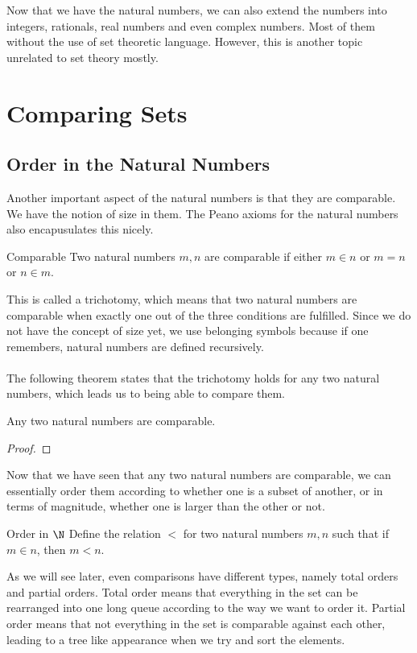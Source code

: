 Now that we have the natural numbers, we can also extend the numbers into integers, rationals, real numbers and even complex numbers. Most of them without the use of set theoretic language. However, this is another topic unrelated to set theory mostly. 

\pagebreak
\section{Comparing Sets}
\subsection{Order in the Natural Numbers}
Another important aspect of the natural numbers is that they are comparable. We have the notion of size in them. The Peano axioms for the natural numbers also encapusulates this nicely. 
\begin{defn}{Comparable}{} Two natural numbers $m,n$ are comparable if either $m\in n$ or $m=n$ or $n\in m$. 
\end{defn}

This is called a trichotomy, which means that two natural numbers are comparable when exactly one out of the three conditions are fulfilled. Since we do not have the concept of size yet, we use belonging symbols because if one remembers, natural numbers are defined recursively. \\~\\
The following theorem states that the trichotomy holds for any two natural numbers, which leads us to being able to compare them. 

\begin{thm}{}{} Any two natural numbers are comparable. \tcbline
\begin{proof}
\end{proof}
\end{thm}

Now that we have seen that any two natural numbers are comparable, we can essentially order them according to whether one is a subset of another, or in terms of magnitude, whether one is larger than the other or not. 

\begin{defn}{Order in $\N$}{} Define the relation $<$ for two natural numbers $m,n$ such that if $m\in n$, then $m<n$. 
\end{defn}

As we will see later, even comparisons have different types, namely total orders and partial orders. Total order means that everything in the set can be rearranged into one long queue according to the way we want to order it. Partial order means that not everything in the set is comparable against each other, leading to a tree like appearance when we try and sort the elements. 

